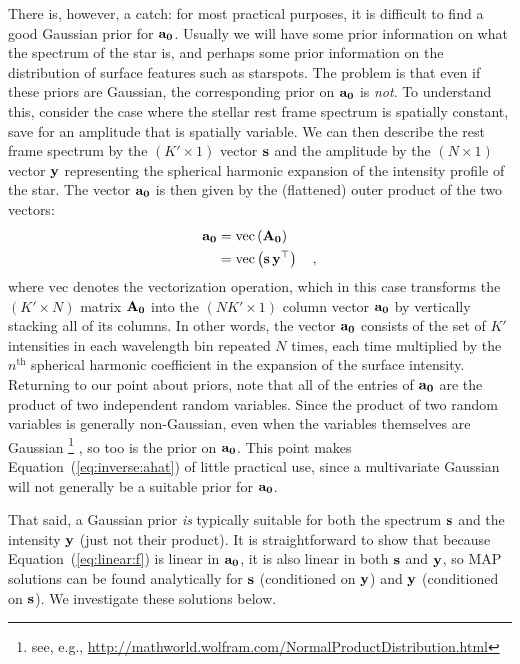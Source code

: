 \documentclass[modern]{aastex631}
\begin{document}
There is, however, a catch: for most practical purposes, it is difficult to find a good Gaussian prior for ${\mathbf{a_0}}$. 
Usually we will have some prior information on what the spectrum of the star is, and perhaps some prior information on the distribution of surface features such as starspots. 
The problem is that even if these priors are Gaussian, the corresponding prior on ${\mathbf{a_0}}$ is \emph{not}. 
To understand this, consider the case where the stellar rest frame spectrum is spatially constant, save for an amplitude that is spatially variable. 
We can then describe the rest frame spectrum by the $(K' \times 1)$ vector ${\mathbf{s}}$ and the amplitude by the $(N \times 1)$ vector ${\mathbf{y}}$ representing the spherical harmonic expansion of the intensity profile of the star. 
The vector ${\mathbf{a_0}}$ is then given by the (flattened) outer product of the two vectors:
%
\begin{align}
    \label{eq:inverse:azero}
    {\ensuremath{\mathbf{a_0}}} & = \mathrm{vec}\left( {\mathbf{A_0}} \right) \nonumber             \\
           & = \mathrm{vec}\left( {\mathbf{s}} \, {\mathbf{y}}^\top \right) \quad,
\end{align}
%
where $\mathrm{vec}$ denotes the vectorization operation, which in this case transforms the $(K' \times N)$ matrix ${\mathbf{A_0}}$ into the $(N K' \times 1)$ column vector ${\mathbf{a_0}}$ by vertically stacking all of its columns. 
In other words, the vector ${\mathbf{a_0}}$ consists of the set of $K'$ intensities in each wavelength bin repeated $N$ times, each time multiplied by the $n^\mathrm{th}$ spherical harmonic coefficient in the expansion of the surface intensity. 
Returning to our point about priors, note that all of the entries of ${\mathbf{a_0}}$ are the product of two independent random variables. 
Since the product of two random variables is generally non-Gaussian, even when the variables themselves are Gaussian%
\footnote{see, e.g., \url{http://mathworld.wolfram.com/NormalProductDistribution.html}}%
, so too is the prior on ${\mathbf{a_0}}$. 
This point makes Equation~(\ref{eq:inverse:ahat}) of little practical use, since a multivariate Gaussian will not generally be a suitable prior for ${\mathbf{a_0}}$.

That said, a Gaussian prior \emph{is} typically suitable for both the spectrum ${\mathbf{s}}$ and the intensity ${\mathbf{y}}$ (just not their product). 
It is straightforward to show that because Equation~(\ref{eq:linear:f}) is linear in ${\mathbf{a_0}}$, it is also linear in both ${\mathbf{s}}$ and ${\mathbf{y}}$, so MAP solutions can be found analytically for ${\mathbf{s}}$ (conditioned on ${\mathbf{y}}$) and ${\mathbf{y}}$ (conditioned on ${\mathbf{s}}$). 
We investigate these solutions below.
\end{document}
